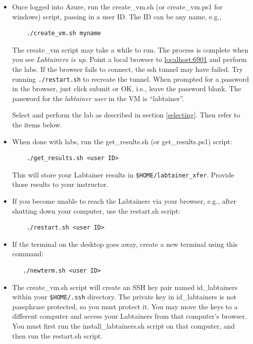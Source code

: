 \documentclass[12pt]{article}
\begin{document}
\begin{itemize}
\item Once logged into Azure, run the create\_vm.sh (or create\_vm.ps1 for windows) script, passing in a user ID.
The ID can be any name, e.g.,
\begin{verbatim}
    ./create_vm.sh myname
\end{verbatim}

The create\_vm script may take a while to run.  The process is complete when you see \textit{Labtainers is up}.  
Point a local browser to \url{localhost:6901} and perform the labs.  If the browser fails to connect, the ssh
tunnel may have failed.  Try running {\tt ./restart.sh} to recreate the tunnel.
When prompted for a password in the browser, just click submit or OK, i.e., leave the password blank.
The password for the \textit{labtainer user} in the VM is ``labtainer''.  

Select and perform the lab as described in section \ref{selecting}.  Then refer to the items below.

\item When done with labs, run the get\_results.sh (or get\_results.ps1) script: 
\begin{verbatim}
    ./get_results.sh <user ID>
\end{verbatim}
\noindent This will store your Labtainer results in {\tt \$HOME/labtainer\_xfer}.  Provide those
results to your instructor.

\item If you become unable to reach the Labtainers via your browser, e.g., after 
shutting down your computer, use the restart.sh script:
\begin{verbatim}
    ./restart.sh <user ID>
\end{verbatim}

\item If the terminal on the desktop goes away, create a new
terminal using this command:
\begin{verbatim}
   ./newterm.sh <user ID>
\end{verbatim}

\item The create\_vm.sh script will create an SSH key pair named id\_labtainers within your {\tt \$HOME/.ssh} directory.
The private key in id\_labtainers is not passphrase protected, so you must protect it.
You may move the keys to a different computer and access your Labtainers from that computer's
browser.  You must first run the install\_labtainers.sh script on that computer, and then run
the restart.sh script.


\end{itemize}
\end{document}
